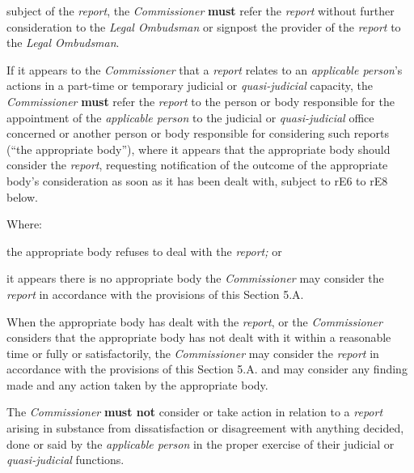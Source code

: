 subject of the \emph{report}, the \emph{Commissioner}  \textcolor{myred}{\textbf{must}} refer
the \emph{report} without further consideration to the \emph{Legal
Ombudsman} or signpost the provider of the \emph{report} to
the \emph{Legal Ombudsman}.\\
\par
{}\par
If it appears to the \emph{Commissioner} that a \emph{report} relates to
an \emph{applicable person}'s actions in a part-time or temporary
judicial or \emph{quasi-judicial} capacity, the \emph{Commissioner}  \textcolor{myred}{\textbf{must}}
refer the \emph{report} to the person or body responsible for the
appointment of the \emph{applicable person} to the judicial
or \emph{quasi-judicial} office concerned or another  person or body
responsible for considering such reports (``the appropriate body''),
where it appears that the appropriate body should consider
the \emph{report}, requesting notification of the outcome of the
appropriate body's consideration as soon as it has been dealt with,
subject to rE6 to rE8 below.\\
\par
Where:\\\nl \item the appropriate body refuses to deal with the \emph{report; }or\item it appears there is no appropriate body\ln
the \emph{Commissioner} may consider the \emph{report} in accordance
with the provisions of this Section 5.A.\\
\par
When the appropriate body has dealt with the \emph{report}, or
the \emph{Commissioner} considers that the appropriate body has not
dealt with it within a reasonable time or fully or satisfactorily,
the \emph{Commissioner} may consider the \emph{report} in accordance
with the provisions of this Section 5.A. and may consider any finding
made and any action taken by the appropriate body.
\par
The \emph{Commissioner}  \textcolor{myred}{\textbf{must not}} consider or take action in relation to
a \emph{report} arising in substance from dissatisfaction or
disagreement with anything decided, done or said by the \emph{applicable
person} in the proper exercise of their judicial
or \emph{quasi-judicial} functions.\\
